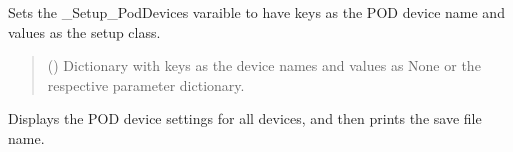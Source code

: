 \documentclass[letterpaper,10pt,english]{sphinxmanual}
\begin{document}
\begin{fulllineitems}
\begin{fulllineitems}
\end{fulllineitems}


\begin{fulllineitems}
\label{\detokenize{Setup.SetupAllDevices:Setup.SetupAllDevices.Setup_PodDevices.SetupAll._Set_Setup_PodDevices}}
\pysigstartsignatures
{}
\pysigstopsignatures
\sphinxAtStartPar
Sets the \_Setup\_PodDevices varaible to have keys as the POD device name and values         as the setup class.
\begin{quote}\begin{description}
\sphinxAtStartPar
{} (\sphinxstyleliteralemphasis{\sphinxupquote{{[}}}\sphinxstyleliteralemphasis{\sphinxupquote{,}}\sphinxstyleliteralemphasis{\sphinxupquote{ | }}\sphinxstyleliteralemphasis{\sphinxupquote{{]}}}) \textendash{} Dictionary with keys as the device names                 and values as None or the respective parameter dictionary.

\end{description}\end{quote}

\end{fulllineitems}


\begin{fulllineitems}
\label{\detokenize{Setup.SetupAllDevices:Setup.SetupAllDevices.Setup_PodDevices.SetupAll._ShowCurrentSettings}}
\pysigstartsignatures
{}
\pysigstopsignatures
\sphinxAtStartPar
Displays the POD device settings for all devices, and then prints the save file name.


\end{fulllineitems}
\end{fulllineitems}
\end{document}
